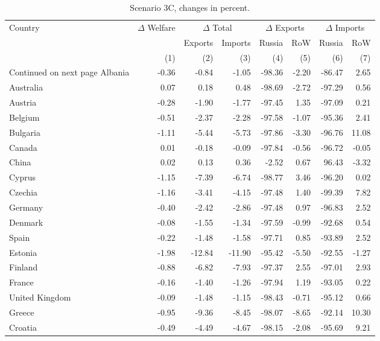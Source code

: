 \begin{longtable}{lrrrrrrr}
\caption{\label{tab:scen-3c}Scenario 3C, changes in percent.} \\ 
  \hline
  Country & $\Delta$ Welfare & \multicolumn{2}{c}{$\Delta$ Total} & \multicolumn{2}{c}{$\Delta$ Exports} & \multicolumn{2}{c}{$\Delta$ Imports} \\
&&Exports&Imports&Russia&RoW&Russia&RoW}\\\cmidrule{2-8}
&(1)&(2)&(3)&(4)&(5)&(6)&(7)} \\
\endhead
\hline
{\footnotesize Continued on next page}
\endfoot
\endlastfoot
 \hline
Albania & -0.36 & -0.84 & -1.05 & -98.36 & -2.20 & -86.47 & 2.65 \\ 
  Australia & 0.07 & 0.18 & 0.48 & -98.69 & -2.72 & -97.29 & 0.56 \\ 
  Austria & -0.28 & -1.90 & -1.77 & -97.45 & 1.35 & -97.09 & 0.21 \\ 
  Belgium & -0.51 & -2.37 & -2.28 & -97.58 & -1.07 & -95.36 & 2.41 \\ 
  Bulgaria & -1.11 & -5.44 & -5.73 & -97.86 & -3.30 & -96.76 & 11.08 \\ 
  Canada & 0.01 & -0.18 & -0.09 & -97.84 & -0.56 & -96.72 & -0.05 \\ 
  China & 0.02 & 0.13 & 0.36 & -2.52 & 0.67 & 96.43 & -3.32 \\ 
  Cyprus & -1.15 & -7.39 & -6.74 & -98.77 & 3.46 & -96.20 & 0.02 \\ 
  Czechia & -1.16 & -3.41 & -4.15 & -97.48 & 1.40 & -99.39 & 7.82 \\ 
  Germany & -0.40 & -2.42 & -2.86 & -97.48 & 0.97 & -96.83 & 2.52 \\ 
  Denmark & -0.08 & -1.55 & -1.34 & -97.59 & -0.99 & -92.68 & 0.54 \\ 
  Spain & -0.22 & -1.48 & -1.58 & -97.71 & 0.85 & -93.89 & 2.52 \\ 
  Estonia & -1.98 & -12.84 & -11.90 & -95.42 & -5.50 & -92.55 & -1.27 \\ 
  Finland & -0.88 & -6.82 & -7.93 & -97.37 & 2.55 & -97.01 & 2.93 \\ 
  France & -0.16 & -1.40 & -1.26 & -97.94 & 1.19 & -93.05 & 0.22 \\ 
  United Kingdom & -0.09 & -1.48 & -1.15 & -98.43 & -0.71 & -95.12 & 0.66 \\ 
  Greece & -0.95 & -9.36 & -8.45 & -98.07 & -8.65 & -92.14 & 10.30 \\ 
  Croatia & -0.49 & -4.49 & -4.67 & -98.15 & -2.08 & -95.69 & 9.21 \\ 

\end{longtable}
